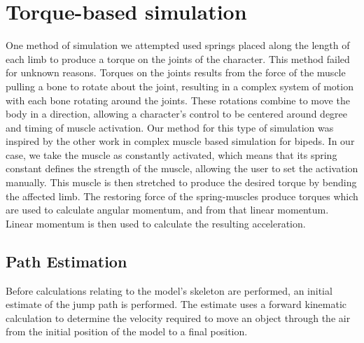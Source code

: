 \section{Torque-based simulation}
\label{section:torque}
One method of simulation we attempted used springs placed along the length of each limb to produce a torque on the joints of the character.  This method failed for unknown reasons.  Torques on the joints results from the force of the muscle pulling a bone to rotate about the joint, resulting in a complex system of motion with each bone rotating around the joints.  These rotations combine to move the body in a direction, allowing a character's control to be centered around degree and timing of muscle activation. Our method for this type of simulation was inspired by the other work in complex muscle based simulation for bipeds. \cite{muscle_based_bipeds}  In our case, we take the muscle as constantly activated, which means that its spring constant defines the strength of the muscle, allowing the user to set the activation manually.  This muscle is then stretched to produce the desired torque by bending the affected limb.  The restoring force of the spring-muscles produce torques which are used to calculate angular momentum, and from that linear momentum.  Linear momentum is then used to calculate the resulting acceleration.

\subsection{Path Estimation}
\label{subsection:torque_path}
%	

Before calculations relating to the model's skeleton are performed, an initial estimate of the jump path is performed.  The estimate uses a forward kinematic calculation to determine the velocity required to move an object through the air from the initial position of the model to a final position.

